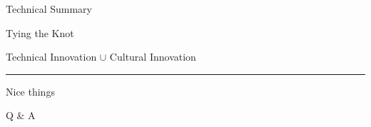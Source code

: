 \documentclass{beamer}
\begin{document}
\begin{frame}{Technical Summary}


\end{frame}


\begin{frame}{Tying the Knot}

	\begin{centering}

		{\Large Technical Innovation $\cup$ Cultural Innovation}

		\rule{\textwidth}{0.1em}

		{\LARGE Nice things}

	\end{centering}

\end{frame}


\begin{frame}[standout]

	Q \& A

\end{frame}
\end{document}

